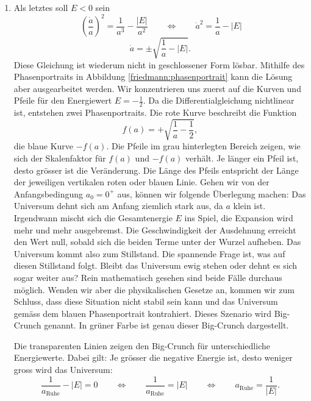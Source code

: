 \begin{refsection}
\begin{enumerate}
	\item Als letztes soll $E < 0$ sein
	\[\ \left(\frac{\dot{a}}{a} \right)^2 = \frac{1}{a^3} - \frac{|E|}{a^2} \qquad \Leftrightarrow \qquad \dot{a}^2 = \frac{1}{a} - |E|\]
	\begin{equation}
	\dot{a} = \pm \sqrt{\frac{1}{a} - |E|}.
	\end{equation}
	Diese Gleichung ist wiederum nicht in geschlossener Form lösbar. Mithilfe des Phasenportraits in Abbildung \ref{friedmann:phasenportrait} kann die Lösung aber ausgearbeitet werden. Wir konzentrieren uns zuerst auf die Kurven und Pfeile für den Energiewert $E = -\frac{1}{2}$. Da die Differentialgleichung nichtlinear ist, entstehen zwei Phasenportraits.  Die rote Kurve beschreibt die Funktion \[f(a) = + \sqrt{\frac{1}{a} - \frac{1}{2}},\] die blaue Kurve $-f(a)$. Die Pfeile im grau hinterlegten Bereich zeigen, wie sich der Skalenfaktor für $f(a)$ und $-f(a)$ verhält. Je länger ein Pfeil ist, desto grösser ist die Veränderung. Die Länge des Pfeils entspricht der Länge der jeweiligen vertikalen roten oder blauen Linie. Gehen wir von der Anfangsbedingung $a_0 = 0^+$ aus, können wir folgende Überlegung machen:
	Das Universum dehnt sich am Anfang ziemlich stark aus, da $a$ klein ist. Irgendwann mischt sich die Gesamtenergie $E$ ins Spiel, die Expansion wird mehr und mehr ausgebremst. Die Geschwindigkeit der Ausdehnung erreicht den Wert null, sobald sich die beiden Terme unter der Wurzel aufheben. Das Universum kommt also zum Stillstand. 
	Die spannende Frage ist, was auf diesen Stillstand folgt. Bleibt das Universum ewig stehen oder dehnt es sich sogar weiter aus? Rein mathematisch gesehen sind beide Fälle durchaus möglich. Wenden wir aber die physikalischen Gesetze an, kommen wir zum Schluss, dass diese Situation nicht stabil sein kann und das Universum gemäss dem blauen Phasenportrait kontrahiert. Dieses Szenario wird Big-Crunch genannt. In grüner Farbe ist genau dieser Big-Crunch dargestellt. 
		
	Die transparenten Linien zeigen den Big-Crunch für unterschiedliche Energiewerte. Dabei gilt: Je grösser die negative Energie ist, desto weniger gross wird das Universum:
	\[\frac{1}{a_\text{Ruhe}} - |E| = 0 \qquad\Leftrightarrow \qquad \frac{1}{a_\text{Ruhe}} = |E| \qquad\Leftrightarrow\qquad a_\text{Ruhe} = \frac{1}{|E|}.\]
\end{enumerate}


\end{refsection}

